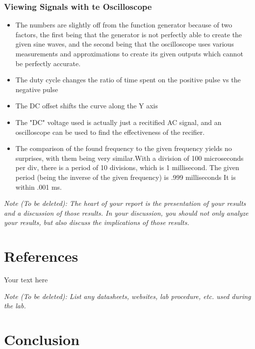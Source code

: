 \documentclass[10pt]{article}
\begin{document}
	\subsubsection{Viewing Signals with te Oscilloscope}
	\begin{itemize}
	\item The numbers are slightly off from the function generator because of two factors, the first being that the generator is not perfectly able to create the given sine waves, and the second being that the oscilloscope uses various measurements and approximations to create its given outputs which cannot be perfectly accurate.
	\item The duty cycle changes the ratio of time spent on the positive pulse vs the negative pulse
	\item The DC offset shifts the curve along the Y axis
	\item The "DC" voltage used is actually just a recitified AC signal, and an oscilloscope can be used to find the effectiveness of the recifier.
	\item The comparison of the found frequency to the given frequency yields no surprises, with them being very similar.With a division of 100 microseconds per div, there is a period of 10 divisions, which is 1 millisecond. The given period (being the inverse of the given frequency) is .999 milliseconds It is within .001 ms.

	\end{itemize}

	\medskip
	
	\textit{Note (To be deleted): The heart of your report is the presentation of your results and a discussion of those results. In your discussion, you should not only analyze your results, but also discuss the implications of those results.}
	
	\section{References}
	
	Your text here
	
	\medskip
	
	\textit{Note (To be deleted): List any datasheets, websites, lab procedure, etc. used during the lab.}
	
	\section{Conclusion}
	
\end{document}
